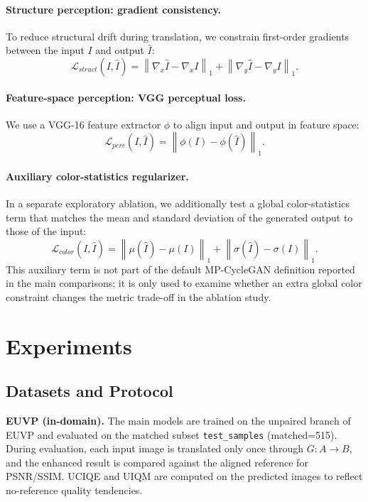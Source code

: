 \documentclass[final,1p,times]{elsarticle}
\begin{document}
\paragraph{Structure perception: gradient consistency.}
To reduce structural drift during translation, we constrain first-order gradients between the input $I$ and output $\hat{I}$:
\begin{equation}
\mathcal{L}_{struct}(I,\hat{I})=\left\|\nabla_x \hat{I}-\nabla_x I\right\|_1+\left\|\nabla_y \hat{I}-\nabla_y I\right\|_1.
\end{equation}
\paragraph{Feature-space perception: VGG perceptual loss.}
We use a VGG-16 feature extractor $\phi$ to align input and output in feature space:
\begin{equation}
\mathcal{L}_{perc}(I,\hat{I})=\left\|\phi(I)-\phi(\hat{I})\right\|_1.
\end{equation}

\paragraph{Auxiliary color-statistics regularizer.}
In a separate exploratory ablation, we additionally test a global color-statistics term that matches the mean and standard deviation of the generated output to those of the input:
\begin{equation}
\mathcal{L}_{color}(I,\hat{I})=\left\|\mu(\hat{I})-\mu(I)\right\|_1+\left\|\sigma(\hat{I})-\sigma(I)\right\|_1.
\end{equation}
This auxiliary term is not part of the default MP-CycleGAN definition reported in the main comparisons; it is only used to examine whether an extra global color constraint changes the metric trade-off in the ablation study.

\section{Experiments}
\subsection{Datasets and Protocol}
\textbf{EUVP (in-domain).} The main models are trained on the unpaired branch of EUVP and evaluated on the matched subset \texttt{test\_samples} (matched=515). During evaluation, each input image is translated only once through $G: A\rightarrow B$, and the enhanced result is compared against the aligned reference for PSNR/SSIM. UCIQE and UIQM are computed on the predicted images to reflect no-reference quality tendencies.
\end{document}
